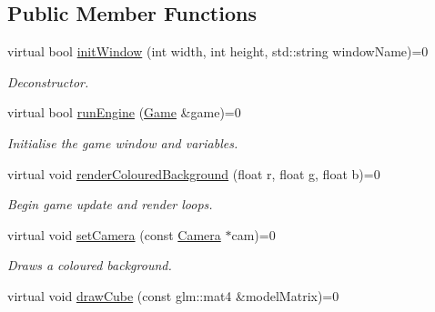 \subsection*{Public Member Functions}
\begin{DoxyCompactItemize}
\item 
\hypertarget{class_i_engine_core_a27123704f8f24eefd9cb47aa9986cbf3}{virtual bool \hyperlink{class_i_engine_core_a27123704f8f24eefd9cb47aa9986cbf3}{init\+Window} (int width, int height, std\+::string window\+Name)=0}\label{class_i_engine_core_a27123704f8f24eefd9cb47aa9986cbf3}

\begin{DoxyCompactList}\small\item\em Deconstructor. \end{DoxyCompactList}\item 
\hypertarget{class_i_engine_core_ad03940f571ec20ba7427feeca44ace21}{virtual bool \hyperlink{class_i_engine_core_ad03940f571ec20ba7427feeca44ace21}{run\+Engine} (\hyperlink{class_game}{Game} \&game)=0}\label{class_i_engine_core_ad03940f571ec20ba7427feeca44ace21}

\begin{DoxyCompactList}\small\item\em Initialise the game window and variables. \end{DoxyCompactList}\item 
\hypertarget{class_i_engine_core_a8f8e0778f04c50b680cdde167cb38e2f}{virtual void \hyperlink{class_i_engine_core_a8f8e0778f04c50b680cdde167cb38e2f}{render\+Coloured\+Background} (float r, float g, float b)=0}\label{class_i_engine_core_a8f8e0778f04c50b680cdde167cb38e2f}

\begin{DoxyCompactList}\small\item\em Begin game update and render loops. \end{DoxyCompactList}\item 
\hypertarget{class_i_engine_core_ab2f643ce25708c87b20eecdcbb18b9ac}{virtual void \hyperlink{class_i_engine_core_ab2f643ce25708c87b20eecdcbb18b9ac}{set\+Camera} (const \hyperlink{class_camera}{Camera} $\ast$cam)=0}\label{class_i_engine_core_ab2f643ce25708c87b20eecdcbb18b9ac}

\begin{DoxyCompactList}\small\item\em Draws a coloured background. \end{DoxyCompactList}\item 
\hypertarget{class_i_engine_core_af24745492d6a7c8bd410a6849fbaf854}{virtual void \hyperlink{class_i_engine_core_af24745492d6a7c8bd410a6849fbaf854}{draw\+Cube} (const glm\+::mat4 \&model\+Matrix)=0}\label{class_i_engine_core_af24745492d6a7c8bd410a6849fbaf854}


\end{DoxyCompactItemize}
